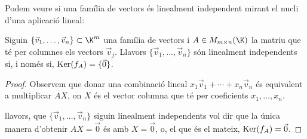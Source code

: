 Podem veure si una família de vectors és linealment independent mirant el nucli d'una aplicació lineal:
\begin{proposicio}
    Siguin $\{\vec v_1, \dots, \vec v_n\}\subset \K^m$ una família de vectors i $A\in M_{m\times n}(\K)$ la matriu que té per columnes els vectors $\vec v_j$. Llavors $\{\vec v_1, \dots, \vec v_n\}$ són linealment independents si, i només si, $\operatorname{Ker}(f_A)=\{\vec 0\}$.
\end{proposicio}
\begin{proof}
    Observem que donar una combinació lineal $x_1\vec v_1+ \cdots+x_n \vec v_n$ és equivalent a multiplicar $AX$, on $X$ és el vector columna que té per coeficients $x_1, \dots, x_n$. 
    
    llavors, que $\{\vec v_1, \dots, \vec v_n\}$ siguin linealment independents vol dir que la única manera d'obtenir $AX=\vec 0$ és amb $X=\vec 0$, o, el que és el mateix, $\operatorname{Ker}(f_A)=\vec 0$. 
\end{proof}

